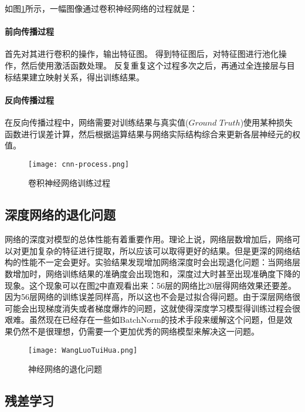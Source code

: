 如图\ref{cnn-process}所示，一幅图像通过卷积神经网络的过程就是：

\paragraph{前向传播过程}

首先对其进行卷积的操作，输出特征图。
得到特征图后，对特征图进行池化操作，然后使用激活函数处理。
反复重复这个过程多次之后，再通过全连接层与目标结果建立映射关系，得出训练结果。

\paragraph{反向传播过程}

在反向传播过程中，网络需要对训练结果与真实值($Ground$ $Truth$)使用某种损失函数进行误差计算，然后根据运算结果与网络实际结构综合来更新各层神经元的权值。

\begin{figure}
	\center
	{\texttt{[image: cnn-process.png]}}
	\caption{卷积神经网络训练过程}
	\label{cnn-process}
\end{figure}

\subsection{深度网络的退化问题}

网络的深度对模型的总体性能有着重要作用。理论上说，网络层数增加后，网络可以对更加复杂的特征进行提取，所以应该可以取得更好的结果。但是更深的网络结构的性能不一定会更好。实验结果发现增加网络深度时会出现退化问题：当网络层数增加时，网络训练结果的准确度会出现饱和，深度过大时甚至出现准确度下降的现象。这个现象可以在图\ref{WangLuoTuiHua}中直观看出来：56层的网络比20层得网络效果还要差。因为56层网络的训练误差同样高，所以这也不会是过拟合得问题。由于深层网络很可能会出现梯度消失或者梯度爆炸的问题，这就使得深度学习模型得训练过程会很艰难。虽然现在已经存在一些如BatchNorm的技术手段来缓解这个问题，但是效果仍然不是很理想，仍需要一个更加优秀的网络模型来解决这一问题。

\begin{figure}
	\center
	{\texttt{[image: WangLuoTuiHua.png]}}
	\caption{神经网络的退化问题}
	\label{WangLuoTuiHua}
\end{figure}

\subsection{残差学习}

